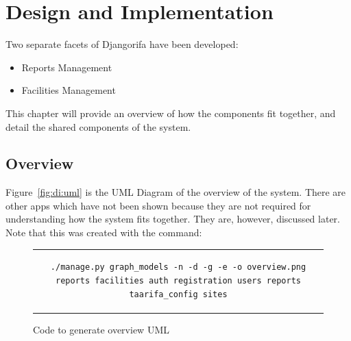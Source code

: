 \chapter{Design and Implementation}
Two separate facets of Djangorifa have been developed:
\begin{itemize}
\item Reports Management
\item Facilities Management
\end{itemize}

This chapter will provide an overview of how the components fit together, and detail the shared components of the system.

\section{Overview}
\label{sec:di:ov}

Figure~\ref{fig:di:uml} is the UML Diagram of the overview of the system. There are other apps which have not been shown because they are not required for understanding how the system fits together. They are, however, discussed later. Note that this was created with the command:

\begin{figure}[thp]
	\centering
	\begin{tabular}{c}
	\begin{lstlisting}[label={lst:graph_models},breaklines=true]
	./manage.py graph_models -n -d -g -e -o overview.png reports facilities auth registration users reports taarifa_config sites
	\end{lstlisting}
	\end{tabular}
	\caption{Code to generate overview UML}
\end{figure}

